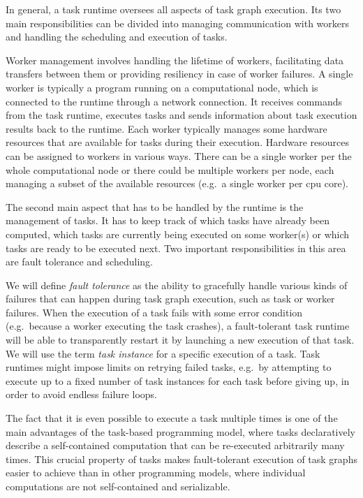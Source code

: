 In general, a task runtime oversees all aspects of task graph execution. Its two main
responsibilities can be divided into managing communication with workers and handling the
scheduling and execution of tasks.

Worker management involves handling the lifetime of workers, facilitating data transfers between them or providing resiliency in case of worker
failures. A single worker is typically a program running on a computational node, which is
connected to the runtime through a network connection. It receives commands from the task runtime,
executes tasks
and sends
information about task execution results back to the runtime. Each worker typically manages some
hardware resources that are available for tasks during their execution. Hardware resources can be
assigned to workers in various ways. There can be a single worker per the whole computational node
or there could be multiple workers per node, each managing a subset of the available resources
(e.g.\ a single worker per \gls{cpu} core).

The second main aspect that has to be handled by the runtime is the management of tasks. It has to
keep track of which tasks have already been computed, which tasks are currently being executed on
some worker(s) or which tasks are ready to be executed next. Two important responsibilities in this area are fault tolerance and
scheduling.

We will define \emph{fault tolerance} as the ability to
gracefully handle various kinds of failures that can happen during task graph execution, such as
task or worker failures. When
the execution of a task fails with some error condition (e.g.\ because a worker executing the task
crashes), a fault-tolerant task runtime will be able to transparently restart it by launching a new
execution of that task. We will use the term \emph{task instance} for a specific execution of a
task. Task runtimes might impose limits on retrying failed tasks, e.g.\ by attempting to
execute up to a fixed number of task instances for each task before giving up, in order to avoid
endless failure loops.

The fact that it is even possible to execute a task multiple times is one of the main advantages of
the task-based programming model, where tasks declaratively describe a self-contained computation
that can be re-executed arbitrarily many times. This crucial property of tasks makes fault-tolerant
execution of task graphs easier to achieve than in other programming models, where individual
computations are not self-contained and serializable.

